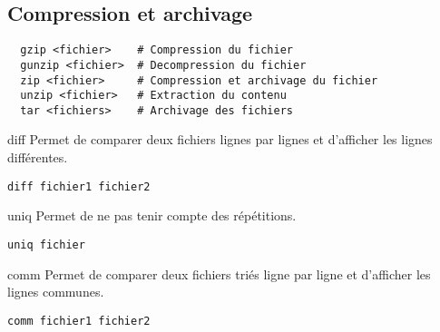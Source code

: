 \documentclass{article}
\begin{document}
\subsection{Compression et archivage}
\begin{lstlisting}
  gzip <fichier>    # Compression du fichier
  gunzip <fichier>  # Decompression du fichier
  zip <fichier>     # Compression et archivage du fichier
  unzip <fichier>   # Extraction du contenu
  tar <fichiers>    # Archivage des fichiers
\end{lstlisting}

diff
Permet de comparer deux fichiers lignes par lignes et d'afficher les lignes différentes.
\begin{lstlisting}
diff fichier1 fichier2
\end{lstlisting}

uniq
Permet de ne pas tenir compte des répétitions.
\begin{lstlisting}
uniq fichier
\end{lstlisting}

comm
Permet de comparer deux fichiers triés ligne par ligne et d'afficher les lignes communes.
\begin{lstlisting}
comm fichier1 fichier2
\end{lstlisting}
\end{document}
